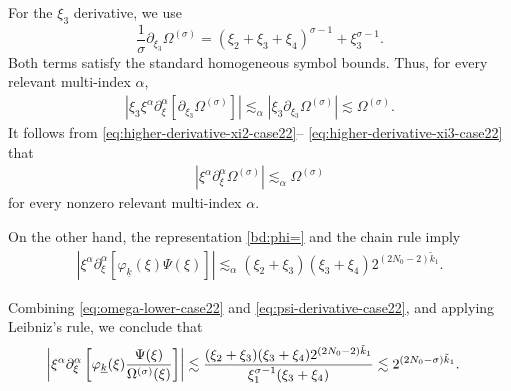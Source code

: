 \documentclass[UTF-8,reqno]{amsart}
\numberwithin{equation}{section}
\theoremstyle{definition}
\begin{document}
For the $\xi_3$ derivative, we use
\[
    \frac1\sigma
    \partial_{\xi_3}\Omega^{(\sigma)}
    =
    (\xi_2+\xi_3+\xi_4)^{\sigma-1}
    +\xi_3^{\sigma-1}.
\]
Both terms satisfy the standard homogeneous symbol bounds. Thus,
for every relevant multi-index $\alpha$,
\begin{align}
\left|
\xi_3\xi^\alpha
\partial_\xi^\alpha
\left[
\partial_{\xi_3}\Omega^{(\sigma)}
\right]
\right|
\lesssim_\alpha
\left|
\xi_3\partial_{\xi_3}\Omega^{(\sigma)}
\right|
\lesssim
\Omega^{(\sigma)}.
\label{eq:higher-derivative-xi3-case22}
\end{align}
It follows from
\eqref{eq:higher-derivative-xi2-case22}--%
\eqref{eq:higher-derivative-xi3-case22} that
\begin{align*}
\left|
\xi^\alpha\partial_\xi^\alpha
\Omega^{(\sigma)}
\right|
\lesssim_\alpha
\Omega^{(\sigma)}
\end{align*}
for every nonzero relevant multi-index $\alpha$. 

On the other hand, the representation \eqref{bd:phi=} and the chain
rule imply
\begin{align}
\left|
\xi^\alpha\partial_\xi^\alpha
\left[
\varphi_{\underline k}(\xi)\Psi(\xi)
\right]
\right|
\lesssim_\alpha
(\xi_2+\xi_3)(\xi_3+\xi_4)
2^{(2N_0-2)\tilde k_1}.
\label{eq:psi-derivative-case22}
\end{align} 

Combining \eqref{eq:omega-lower-case22}  and
\eqref{eq:psi-derivative-case22}, and applying Leibniz's rule, we
conclude that
\begin{align}
\left|
\xi^\alpha\partial_\xi^\alpha
\left[
\varphi_{\underline{k}}(\xi)
\frac{\Psi(\xi)}{\Omega^{(\sigma)}(\xi)}
\right]
\right|
&\lesssim
\frac{
(\xi_2+\xi_3)(\xi_3+\xi_4)
2^{(2N_0-2)\tilde k_1}
}{
\xi_1^{\sigma-1}(\xi_3+\xi_4)
} \lesssim
2^{(2N_0-\sigma)\tilde k_1}.\notag
\end{align}
  
\end{document}
